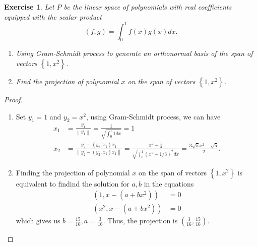 \documentclass[11pt]{book}
\newtheorem{exercise}{Exercise}[section]
\theoremstyle{definition}
\numberwithin{equation}{subsection}
\begin{document}
\begin{exercise}
Let $P$ be the linear space of polynomials with real coefficients
equipped with the scalar product%
$$
\left(  f,g\right)  =\int_{0}^{1}f\left(  x\right)  g\left(  x\right)  dx.
$$
\begin{enumerate}[label=(\arabic*)]
    \item Using Gram-Schmidt process to generate an orthonormal basis of the span of vectors $\left\{  1,x^{2}\right\}$.
    \item Find the projection of polynomial $x$ on the span of vectors $\left\{  1,x^{2}\right\}$.
\end{enumerate}
\end{exercise}
\begin{proof}
~\begin{enumerate}[label=(\arabic*)]
    \item Set $y_1 = 1$ and $y_2 = x^2$, using Gram-Schmidt process, we can have 
    \begin{align*}
        x_1 & = \frac{y_1}{\left \|y_1\right \|} = \frac{1}{\sqrt{\int^1_0 1dx}} = 1 \\
        x_2 & = \frac{y_2-(y_2,x_1)x_1}{\left \|y_2-(y_2,x_1)x_1\right \|} = \frac{x^2 - \frac{1}{3}}{\sqrt{\int^1_0 (x^2 - 1/3)^2}dx} = \frac{3\sqrt{5}x^2 - \sqrt{5}}{2}.
    \end{align*}
    \item Finding the projection of polynomial $x$ on the span of vectors $\left\{  1,x^{2}\right\}$ is equivalent to findind the solution for $a,b$ in the equations
    \begin{align*}
        (1,x-(a+bx^2)) & = 0 \\
        (x^2,x-(a+bx^2)) & = 0 
    \end{align*}
    which gives us $b = \frac{15}{16}, a = \frac{3}{16}$. Thus, the projection is $\left(\frac{3}{16},\frac{15}{16}\right)$.
\end{enumerate}
\end{proof}

\medskip
\end{document}
